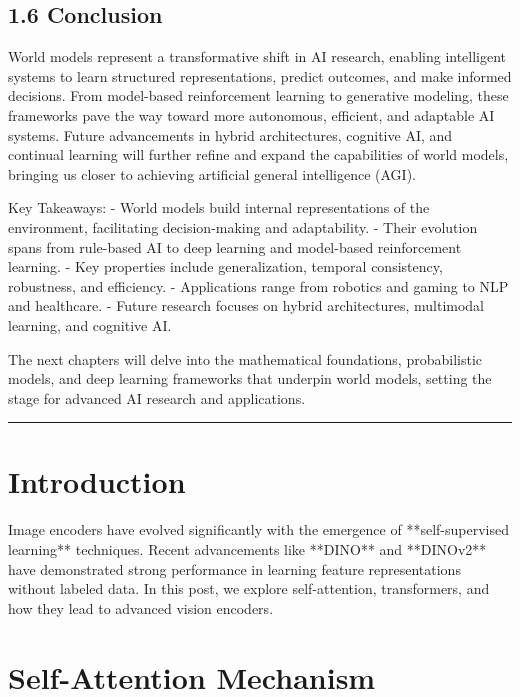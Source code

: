\documentclass[
]{book}
\begin{document}
\section{1.6 Conclusion}\label{conclusion}

World models represent a transformative shift in AI research, enabling intelligent systems to learn structured representations, predict outcomes, and make informed decisions. From model-based reinforcement learning to generative modeling, these frameworks pave the way toward more autonomous, efficient, and adaptable AI systems. Future advancements in hybrid architectures, cognitive AI, and continual learning will further refine and expand the capabilities of world models, bringing us closer to achieving artificial general intelligence (AGI).

Key Takeaways:
- World models build internal representations of the environment, facilitating decision-making and adaptability.
- Their evolution spans from rule-based AI to deep learning and model-based reinforcement learning.
- Key properties include generalization, temporal consistency, robustness, and efficiency.
- Applications range from robotics and gaming to NLP and healthcare.
- Future research focuses on hybrid architectures, multimodal learning, and cognitive AI.

The next chapters will delve into the mathematical foundations, probabilistic models, and deep learning frameworks that underpin world models, setting the stage for advanced AI research and applications.

\begin{center}\rule{0.5\linewidth}{0.5pt}\end{center}

\chapter{Introduction}\label{introduction-1}

Image encoders have evolved significantly with the emergence of
**self-supervised learning** techniques. Recent advancements like
**DINO** and **DINOv2** have demonstrated strong performance in
learning feature representations without labeled data. In this post, we
explore self-attention, transformers, and how they lead to advanced
vision encoders.

\chapter{Self-Attention Mechanism}\label{self-attention-mechanism}
\end{document}
